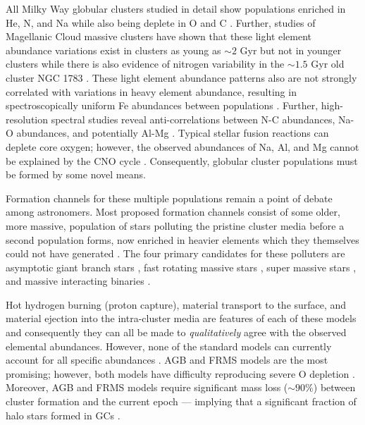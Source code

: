 All Milky Way globular clusters studied in detail show populations enriched in
He, N, and Na while also being deplete in O and C
\citep{Piotto2015,Bastian2018}. Further, studies of Magellanic Cloud
massive clusters have shown that these light element abundance variations exist
in clusters as young as $\sim 2$ Gyr but not in younger clusters
\citep{Martocchia2019} while there is also evidence of nitrogen variability in
the $\sim 1.5$ Gyr old cluster NGC 1783 \citep{Cadelano2022}.  These light
element abundance patterns also are not strongly correlated with variations in
heavy element abundance, resulting in spectroscopically uniform Fe abundances
between populations \citep[though recent work indicates that there may be
iron abundance variations within the first population, e.g.][]{Legnardi2022,
Lardo2022} . Further, high-resolution spectral studies reveal anti-correlations
between N-C abundances, Na-O abundances, and potentially Al-Mg
\citep{Sneden1992, Gratton2012}. Typical stellar fusion reactions can deplete
core oxygen; however, the observed abundances of Na, Al, and Mg cannot be
explained by the CNO cycle \citep{Prantzos2007}. Consequently, globular cluster
populations must be formed by some novel means.

Formation channels for these multiple populations remain a point of debate
among astronomers. Most proposed formation channels consist of some older,
more massive, population of stars polluting the pristine cluster media before a
second population forms, now enriched in heavier elements which they themselves could
not have generated \citep[for a detailed review see ][]{Gratton2012}. The four
primary candidates for these polluters are asymptotic giant branch stars
\citep[AGBs,][]{Ventura2001,DErcole2010}, fast rotating massive stars
\citep[FRMSs,][]{Decressin2007}, super massive stars
\citep[SMSs,][]{Denissenkov2014}, and massive interacting binaries
\citep[MIBs,][]{deMink2009, Bastian2018}. 

Hot hydrogen burning (proton capture), material transport to the surface, and
material ejection into the intra-cluster media are features of each of these
models and consequently they can all be made to {\it qualitatively} agree with
the observed elemental abundances. However, none of the standard models can
currently account for all specific abundances \citep{Gratton2012}. AGB and FRMS
models are the most promising; however, both models have difficulty reproducing
severe O depletion \citep{Ventura2009,Decressin2007}. Moreover, AGB and FRMS
models require significant mass loss ($\sim 90\%$) between cluster formation
and the current epoch --- implying that a significant fraction of halo stars
formed in GCs \citep{Renzini2008,DErcole2008,Bastian2015}.

